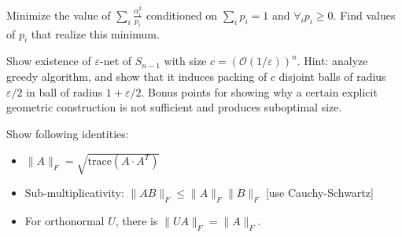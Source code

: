 \documentclass[12pt]{uebung}
\begin{document}
 

\newcommand{\bigo}{\mathcal{O}}
\renewcommand{\aufgname}{Exercise}


\begin{aufg}
Minimize the value of $\sum_{i} \frac{\alpha^2_i}{p_i}$ conditioned on $ \sum_i p_i = 1$ and $\forall_i p_i\ge0$. Find values of $p_i$ that realize this minimum.
\end{aufg}

\begin{aufg}[2+1 pts]
Show existence of $\varepsilon$-net of $S_{n-1}$ with size $c = \left(\bigo(1/\varepsilon)\right)^{n}$. Hint: analyze greedy algorithm, and show that it induces packing of $c$ disjoint balls of radius $\varepsilon/2$ in ball of radius $1+\varepsilon/2$. Bonus points for showing why a certain explicit geometric construction is not sufficient and produces suboptimal size.
\end{aufg}

\begin{aufg}[1+2+1 pts]
Show following identities:
\begin{itemize}
\item $\|A\|_F = \sqrt{\textrm{trace}(A \cdot A^T)}$
\item Sub-multiplicativity: $\|A B\|_F \le \|A\|_F \|B\|_F$  [use Cauchy-Schwartz]
\item For orthonormal $U$, there is $\|UA\|_F = \|A\|_F$.
\end{itemize}
\end{aufg}
\end{document}

